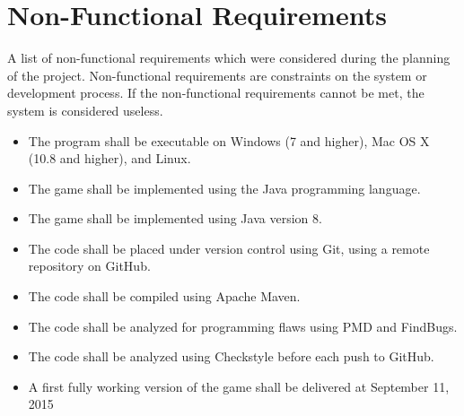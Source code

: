 \section{Non-Functional Requirements}

A list of non-functional requirements which were considered during the planning of the project. Non-functional requirements are constraints on the system or development process. If the non-functional requirements cannot be met, the system is considered useless. 

\begin{itemize}
	\item The program shall be executable on Windows (7 and higher), Mac OS X (10.8 and higher), and Linux.
	\item The game shall be implemented using the Java programming language.
	\item The game shall be implemented using Java version 8.
	\item The code shall be placed under version control using Git, using a remote repository on GitHub.
	\item The code shall be compiled using Apache Maven.
	\item The code shall be analyzed for programming flaws using PMD and FindBugs.
	\item The code shall be analyzed using Checkstyle before each push to GitHub.
	\item A first fully working version of the game shall be delivered at September 11, 2015
\end{itemize}